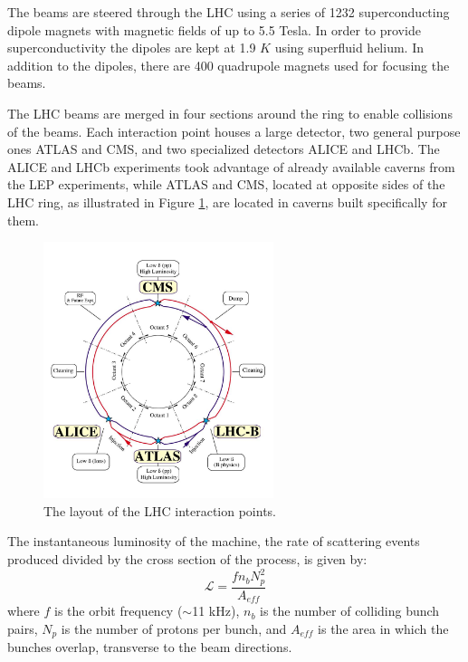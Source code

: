 The beams are steered through the LHC 
using a series of 1232 superconducting dipole magnets with magnetic fields 
of up to 5.5 Tesla. In order to provide superconductivity the 
dipoles are kept at 1.9 $K$ using superfluid helium.
In addition to the dipoles, there are 400 quadrupole magnets used
for focusing the beams.

The LHC beams are
merged in four sections around the ring to enable collisions of the beams. Each interaction point
houses a large detector, two general purpose ones ATLAS and CMS, and two specialized detectors
ALICE and LHCb. The ALICE and LHCb experiments took advantage of already available caverns from
the LEP experiments, while ATLAS and CMS, located at opposite sides of the LHC ring, as illustrated
in Figure \ref{fig:lhc}, are located in caverns built specifically for them.

\begin{figure}[htbp]
\centering
\includegraphics[width=0.6\textwidth]{plots/intro/lhc.jpg}
\caption{The layout of the LHC interaction points.\label{fig:lhc}}
\end{figure}

The instantaneous luminosity of the machine, \ie the rate of scattering events produced divided
by the cross section of the process, is given by:
\begin{equation}
\mathcal{L}=\frac{f n_b N_p^2}{A_{eff}}
\end{equation}
where $f$ is the orbit frequency ($\sim$11 kHz), $n_b$ is the number of colliding bunch pairs, 
$N_p$ is the number of protons per bunch, and $A_{eff}$ is the area in which the bunches
overlap, transverse to the beam directions.


